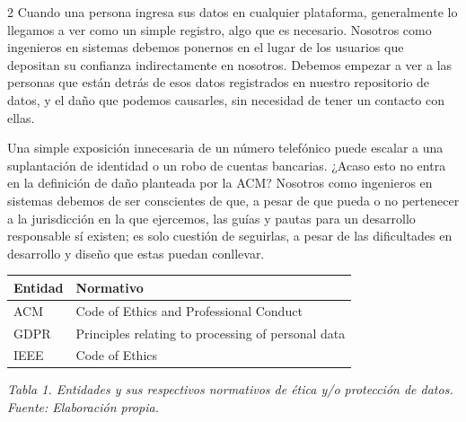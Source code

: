 \documentclass[10pt,spanish,Letterpaper,openany]{book}
\begin{document}
\begin {multicols}{2}
Cuando una persona ingresa sus datos en cualquier plataforma, generalmente lo llegamos a ver como un simple registro, algo que es necesario. Nosotros como ingenieros en sistemas debemos ponernos en el lugar de los usuarios que depositan su confianza indirectamente en nosotros. Debemos empezar a ver a las personas que están detrás de esos datos registrados en nuestro repositorio de datos, y el daño que podemos causarles, sin necesidad de tener un contacto con ellas.

Una simple exposición innecesaria de un número telefónico puede escalar a una suplantación de identidad o un robo de cuentas bancarias. ¿Acaso esto no entra en la definición de daño planteada por la ACM? Nosotros como ingenieros en sistemas debemos de ser conscientes de que, a pesar de que pueda o no pertenecer a la jurisdicción en la que ejercemos, las guías y pautas para un desarrollo responsable sí existen; es solo cuestión de seguirlas, a pesar de las dificultades en desarrollo y diseño que estas puedan conllevar.

\end {multicols}

\begin{longtable}[]{@{}ll@{}}
\toprule\noalign{}
Entidad & Normativo \\
\midrule\noalign{}
\endhead
\bottomrule\noalign{}
\endlastfoot
ACM & Code of Ethics and Professional Conduct \\
GDPR & Principles relating to processing of personal data \\
IEEE & Code of Ethics \\
\end{longtable}

\emph{Tabla 1. Entidades y sus respectivos normativos de ética y/o protección de datos. Fuente: Elaboración propia.}
\end{document}
